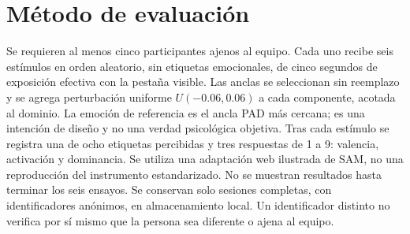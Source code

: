 \documentclass[conference]{IEEEtran}
\begin{document}
\section{Método de evaluación}
Se requieren al menos cinco participantes ajenos al equipo. Cada uno recibe seis estímulos en orden aleatorio, sin etiquetas emocionales, de cinco segundos de exposición efectiva con la pestaña visible. Las anclas se seleccionan sin reemplazo y se agrega perturbación uniforme $U(-0.06,0.06)$ a cada componente, acotada al dominio. La emoción de referencia es el ancla PAD más cercana; es una intención de diseño y no una verdad psicológica objetiva.
Tras cada estímulo se registra una de ocho etiquetas percibidas y tres respuestas de 1 a 9: valencia, activación y dominancia. Se utiliza una adaptación web ilustrada de SAM, no una reproducción del instrumento estandarizado. No se muestran resultados hasta terminar los seis ensayos. Se conservan solo sesiones completas, con identificadores anónimos, en almacenamiento local. Un identificador distinto no verifica por sí mismo que la persona sea diferente o ajena al equipo.
\end{document}
